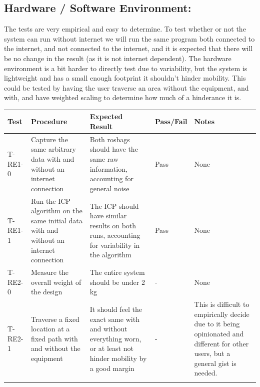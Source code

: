 \documentclass[11pt]{article}
\begin{document}
	\subsection{Hardware / Software Environment:}
	
	The tests are very empirical and easy to determine. To test whether or not the system can run without internet we will run the same program both connected to the internet, and not connected to the internet, and it is expected that there will be no change in the result (as it is not internet dependent). The hardware environment is a bit harder to directly test due to variability, but the system is lightweight and has a small enough footprint it shouldn't hinder mobility. This could be tested by having the user traverse an area without the equipment, and with, and have weighted scaling to determine how much of a hinderance it is. \\
	
	\begin{tabularx}{\textwidth}{X p{} p{} X p{}}
		\toprule
		\textbf{Test} & \textbf{Procedure} & \textbf{Expected Result} & \textbf{Pass/Fail} & \textbf{Notes} \\
		\midrule
		T-RE1-0 & Capture the same arbitrary data with and without an internet connection & Both rosbags should have the same raw information, accounting for general noise & Pass & None\\
		\midrule
		T-RE1-1 & Run the ICP algorithm on the same initial data with and without an internet connection & The ICP should have similar results on both runs, accounting for variability in the algorithm & Pass & None \\
		\midrule
		T-RE2-0 & Measure the overall weight of the design & The entire system should be under 2 kg & - & None\\
		\midrule
		T-RE2-1 & Traverse a fixed location at a fixed path with and without the equipment & It should feel the exact same with and without everything worn, or at least not hinder mobility by a good margin & - & This is difficult to empirically decide due to it being opinionated and different for other users, but a general gist is needed. \\
		\bottomrule
		\caption{Verification Tests for Hardware/Software Requirements}
	\end{tabularx}
	
	
	
\end{document}
